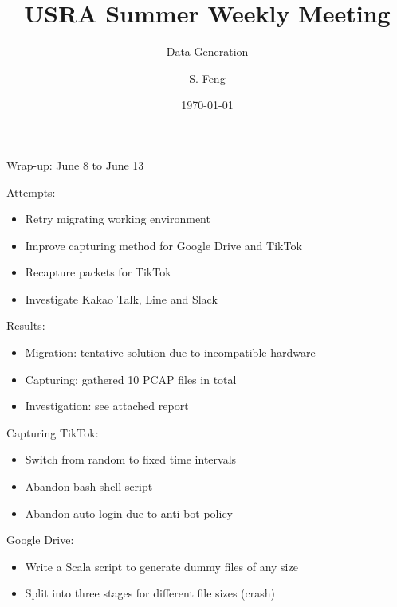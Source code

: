 \documentclass{beamer}
\title[Weekly Meeting]{
    USRA Summer Weekly Meeting
}
\subtitle[]{Data Generation}
\author[Shuo Feng]{S. Feng}
\institute[NIMS Lab]{
  NIMS Lab\\
  USRA Summer 2023}
\date{\today}
\begin{document}
\frame{\titlepage}

\begin{frame}{Wrap-up: June 8 to June 13}

  Attempts:
  \begin{itemize}
    \item Retry migrating working environment
    \item Improve capturing method for Google Drive and TikTok
    \item Recapture packets for TikTok
    \item Investigate Kakao Talk, Line and Slack
  \end{itemize}

  Results:
  \begin{itemize}
    \item Migration: tentative solution due to incompatible hardware
    \item Capturing: gathered 10 PCAP files in total
    \item Investigation: see attached report
  \end{itemize}

\end{frame}

\begin{frame}{Capturing}
  TikTok:
  \begin{itemize}
    \item Switch from random to fixed time intervals
    \item Abandon bash shell script
    \item Abandon auto login due to anti-bot policy
  \end{itemize}

  Google Drive:
  \begin{itemize}
    \item Write a Scala script to generate dummy files of any size
    \item Split into three stages for different file sizes (crash)
  \end{itemize}

\end{frame}
\end{document}
